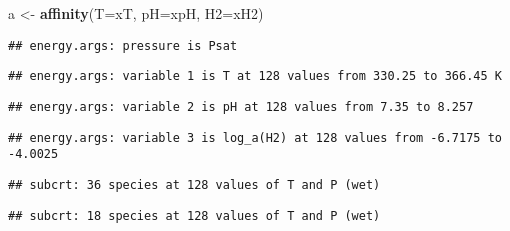 \documentclass[]{article}
\newenvironment{Shaded}{\begin{snugshade}}{\end{snugshade}}
\newcommand{\KeywordTok}[1]{\textcolor[rgb]{0.13,0.29,0.53}{\textbf{#1}}}
\newcommand{\DataTypeTok}[1]{\textcolor[rgb]{0.13,0.29,0.53}{#1}}
\newcommand{\StringTok}[1]{\textcolor[rgb]{0.31,0.60,0.02}{#1}}
\newcommand{\NormalTok}[1]{#1}
\begin{document}
\begin{Shaded}
\begin{Highlighting}[]
\NormalTok{a <-}\StringTok{ }\KeywordTok{affinity}\NormalTok{(}\DataTypeTok{T=}\NormalTok{xT, }\DataTypeTok{pH=}\NormalTok{xpH, }\DataTypeTok{H2=}\NormalTok{xH2)}
\end{Highlighting}
\end{Shaded}

\begin{verbatim}
## energy.args: pressure is Psat
\end{verbatim}

\begin{verbatim}
## energy.args: variable 1 is T at 128 values from 330.25 to 366.45 K
\end{verbatim}

\begin{verbatim}
## energy.args: variable 2 is pH at 128 values from 7.35 to 8.257
\end{verbatim}

\begin{verbatim}
## energy.args: variable 3 is log_a(H2) at 128 values from -6.7175 to -4.0025
\end{verbatim}

\begin{verbatim}
## subcrt: 36 species at 128 values of T and P (wet)
\end{verbatim}

\begin{verbatim}
## subcrt: 18 species at 128 values of T and P (wet)
\end{verbatim}
\end{document}
